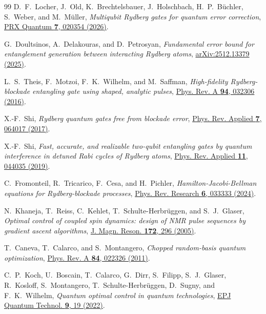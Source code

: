 \documentclass[aps,prx,reprint,nofootinbib,longbibliography,floatfix]{revtex4-2}
\theoremstyle{plain}
\theoremstyle{remark}
\begin{document}
\begin{thebibliography}{99}
D.~F.~Locher, J.~Old, K.~Brechtelsbauer, J.~Holschbach, H.~P.~B{\"u}chler, S.~Weber, and M.~M{\"u}ller,
\emph{Multiqubit Rydberg gates for quantum error correction},
\href{https://doi.org/10.1103/j8fm-24cf}{PRX Quantum \textbf{7}, 020354 (2026)}.

G.~Doultsinos, A.~Delakouras, and D.~Petrosyan,
\emph{Fundamental error bound for entanglement generation between interacting Rydberg atoms},
\href{https://arxiv.org/abs/2512.13379}{arXiv:2512.13379 (2025)}.

L.~S.~Theis, F.~Motzoi, F.~K.~Wilhelm, and M.~Saffman,
\emph{High-fidelity Rydberg-blockade entangling gate using shaped, analytic pulses},
\href{https://doi.org/10.1103/PhysRevA.94.032306}{Phys. Rev. A \textbf{94}, 032306 (2016)}.

X.-F.~Shi,
\emph{Rydberg quantum gates free from blockade error},
\href{https://doi.org/10.1103/PhysRevApplied.7.064017}{Phys. Rev. Applied \textbf{7}, 064017 (2017)}.

X.-F.~Shi,
\emph{Fast, accurate, and realizable two-qubit entangling gates by quantum interference in detuned Rabi cycles of Rydberg atoms},
\href{https://doi.org/10.1103/PhysRevApplied.11.044035}{Phys. Rev. Applied \textbf{11}, 044035 (2019)}.

C.~Fromonteil, R.~Tricarico, F.~Cesa, and H.~Pichler,
\emph{Hamilton-Jacobi-Bellman equations for Rydberg-blockade processes},
\href{https://doi.org/10.1103/PhysRevResearch.6.033333}{Phys. Rev. Research \textbf{6}, 033333 (2024)}.

N.~Khaneja, T.~Reiss, C.~Kehlet, T.~Schulte-Herbr{\"u}ggen, and S.~J.~Glaser,
\emph{Optimal control of coupled spin dynamics: design of NMR pulse sequences by gradient ascent algorithms},
\href{https://doi.org/10.1016/j.jmr.2004.11.004}{J. Magn. Reson. \textbf{172}, 296 (2005)}.

T.~Caneva, T.~Calarco, and S.~Montangero,
\emph{Chopped random-basis quantum optimization},
\href{https://doi.org/10.1103/PhysRevA.84.022326}{Phys. Rev. A \textbf{84}, 022326 (2011)}.

C.~P.~Koch, U.~Boscain, T.~Calarco, G.~Dirr, S.~Filipp, S.~J.~Glaser, R.~Kosloff, S.~Montangero, T.~Schulte-Herbr{\"u}ggen, D.~Sugny, and F.~K.~Wilhelm,
\emph{Quantum optimal control in quantum technologies},
\href{https://doi.org/10.1140/epjqt/s40507-022-00138-x}{EPJ Quantum Technol. \textbf{9}, 19 (2022)}.


\end{thebibliography}
\end{document}
